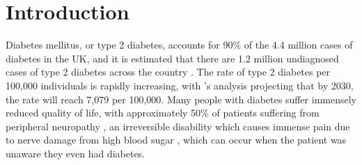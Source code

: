 \documentclass[12pt]{report}
\begin{document}




\chapter{Introduction}

Diabetes mellitus, or type 2 diabetes, accounts for 90\% of the 4.4 million cases of diabetes in the UK, and it is estimated that 
there are 1.2 million undiagnosed cases of type 2 diabetes across the country \autocite{diabetes_uk_how_nodate}. The rate of type 
2 diabetes per 100,000 individuals is rapidly increasing, with \textcite{khan_epidemiology_2020}'s analysis projecting that by 
2030, the rate will reach 7,079 per 100,000. Many people with diabetes suffer immensely reduced quality of life, with approximately 50\% 
of patients suffering from peripheral neuropathy \autocite{dhanapalaratnam_effect_2024}, an irreversible disability which causes immense pain due 
to nerve damage from high blood sugar \autocite{nhs_peripheral_2022}, which can occur when the patient was unaware they even 
had diabetes. 
\end{document}
